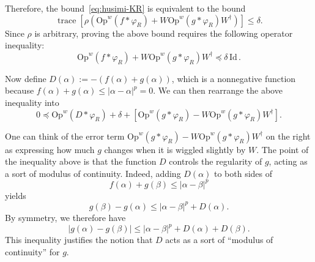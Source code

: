 \documentclass[11pt]{amsart}
\def\Op{\mathrm{Op}}
\def\trace{\operatorname*{trace}}
\numberwithin{equation}{section}
\begin{document}
Therefore, the bound~\eqref{eq:husimi-KR} is equivalent to the bound
\[
\trace[\rho (\Op^w(f\ast \varphi_{R}) + W \Op^w(g\ast \varphi_{R}) W^\dagger) ]
\leq \delta.
\]
Since $\rho$ is arbitrary, proving the above bound requires the following operator inequality:
\[
\Op^w(f\ast \varphi_{R}) + W\Op^w(g\ast\varphi_{R}) W^\dagger
\preceq \delta\,\text{Id}\,.
\]

Now define $D(\alpha) := -(f(\alpha)+g(\alpha))$, which is a nonnegative function because
$f(\alpha)+g(\alpha) \leq |\alpha-\alpha|^p = 0$.  We can then rearrange the above inequality into
\begin{equation}
\label{eq:op-positivity}
0 \preceq \Op^w(D\ast\varphi_{R}) + \delta + [\Op^w(g\ast\varphi_{R}) - W\Op^w(g\ast\varphi_{R})W^\dagger].
\end{equation}

One can think of the error term
$\Op^w(g\ast \varphi_{R}) - W\Op^w(g\ast \varphi_R) W^\dagger$ on the right as expressing how much $g$ changes when
it is wiggled slightly by $W$.  The point
of the inequality above is that the function $D$ controls the regularity of $g$, acting as a sort of modulus of continuity.  Indeed, adding $D(\alpha)$ to both sides of
\[
f(\alpha)+g(\beta) \leq |\alpha-\beta|^p
\]
yields
\[
g(\beta) - g(\alpha) \leq |\alpha-\beta|^p + D(\alpha).
\]
By symmetry, we therefore have
\begin{equation}
\label{eq:gd-cty}
|g(\alpha)-g(\beta)| \leq |\alpha-\beta|^p + D(\alpha)+D(\beta).
\end{equation}
This inequality justifies the notion that $D$ acts as a sort of ``modulus of continuity'' for $g$.   
\end{document}
